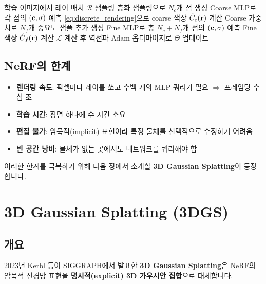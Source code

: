 \documentclass[11pt, a4paper]{report}
\begin{document}
\begin{algorithm}[H]
\caption{NeRF Training (1 iteration)}
\begin{algorithmic}[1]
\STATE 학습 이미지에서 레이 배치 $\mathcal{R}$ 샘플링
  \STATE 층화 샘플링으로 $N_c$개 점 생성
  \STATE Coarse MLP로 각 점의 $(\mathbf{c}, \sigma)$ 예측
  \STATE \cref{eq:discrete_rendering}으로 coarse 색상 $\hat{C}_c(\mathbf{r})$ 계산
  \STATE Coarse 가중치로 $N_f$개 중요도 샘플 추가 생성
  \STATE Fine MLP로 총 $N_c + N_f$개 점의 $(\mathbf{c}, \sigma)$ 예측
  \STATE Fine 색상 $\hat{C}_f(\mathbf{r})$ 계산
\ENDFOR
\STATE $\mathcal{L}$ 계산 후 역전파
\STATE Adam 옵티마이저로 $\Theta$ 업데이트
\end{algorithmic}
\end{algorithm}


\section{NeRF의 한계}

\begin{itemize}[leftmargin=*]
  \item \textbf{렌더링 속도}: 픽셀마다 레이를 쏘고 수백 개의 MLP 쿼리가 필요 $\Rightarrow$ 프레임당 수십 초
  \item \textbf{학습 시간}: 장면 하나에 수 시간 소요
  \item \textbf{편집 불가}: 암묵적(implicit) 표현이라 특정 물체를 선택적으로 수정하기 어려움
  \item \textbf{빈 공간 낭비}: 물체가 없는 곳에서도 네트워크를 쿼리해야 함
\end{itemize}

이러한 한계를 극복하기 위해 다음 장에서 소개할 \textbf{3D Gaussian Splatting}이 등장합니다.


\chapter{3D Gaussian Splatting (3DGS)}
\label{ch:3dgs}

\section{개요}

2023년 Kerbl 등이 SIGGRAPH에서 발표한 \textbf{3D Gaussian Splatting}은 NeRF의 암묵적 신경망 표현을 \textbf{명시적(explicit) 3D 가우시안 집합}으로 대체합니다.
\end{document}
